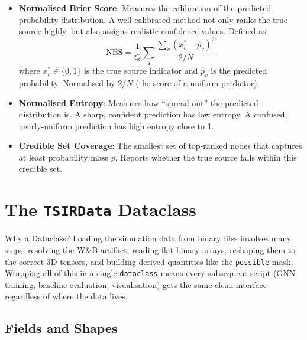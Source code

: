\begin{itemize}
    \item \textbf{Normalised Brier Score}: Measures the calibration of the predicted probability distribution. A well-calibrated method not only ranks the true source highly, but also assigns realistic confidence values. Defined as:
    \[
    \text{NBS} = \frac{1}{Q} \sum_{q} \frac{\sum_v (x_v^* - \hat{p}_v)^2}{2/N}
    \]
    where $x_v^* \in \{0,1\}$ is the true source indicator and $\hat{p}_v$ is the predicted probability. Normalised by $2/N$ (the score of a uniform predictor).

    \item \textbf{Normalised Entropy}: Measures how ``spread out'' the predicted distribution is. A sharp, confident prediction has low entropy. A confused, nearly-uniform prediction has high entropy close to 1.

    \item \textbf{Credible Set Coverage}: The smallest set of top-ranked nodes that captures at least probability mass $p$. Reports whether the true source falls within this credible set.
\end{itemize}

\section{The \texttt{TSIRData} Dataclass}
\label{sec:tsirdata}

\begin{conceptbox}{Why a Dataclass?}
Loading the simulation data from binary files involves many steps: resolving the W\&B artifact, reading flat binary arrays, reshaping them to the correct 3D tensors, and building derived quantities like the \texttt{possible} mask. Wrapping all of this in a single \texttt{dataclass} means every subsequent script (GNN training, baseline evaluation, visualisation) gets the same clean interface regardless of where the data lives.
\end{conceptbox}

\subsection{Fields and Shapes}

